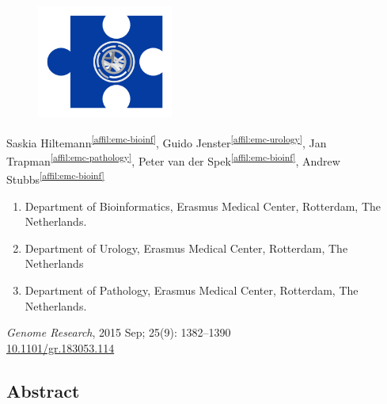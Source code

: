 \setcounter{NAT@ctr}{-1}
\chapter*{}

\begin{figure}[t!]
\centering
\includegraphics[height=10em]{frontmatter/images/chapter-header-variants.png}
\end{figure}
\vspace{-4cm}

\label{chapter:vnmethod}

Saskia Hiltemann\textsuperscript{\ref{affil:emc-bioinf}},
Guido Jenster\textsuperscript{\ref{affil:emc-urology}},
Jan Trapman\textsuperscript{\ref{affil:emc-pathology}},
Peter van der Spek\textsuperscript{\ref{affil:emc-bioinf}},
Andrew Stubbs\textsuperscript{\ref{affil:emc-bioinf}}

\small
\begin{enumerate}
\itemsep-0.5em
\item Department of Bioinformatics, Erasmus Medical Center, Rotterdam, The Netherlands. \label{affil:emc-bioinf}
\item Department of Urology, Erasmus Medical Center, Rotterdam, The Netherlands \label{affil:emc-urology}
\item Department of Pathology, Erasmus Medical Center, Rotterdam, The Netherlands. \label{affil:emc-pathology}
\end{enumerate}

{\color{chaptergrey}{Published in:}} \emph{Genome Research}, 2015 Sep; 25(9): 1382–1390 \\
{\color{chaptergrey}{DOI:}} \hyperref[https://doi.org/10.1101/gr.183053.114]{10.1101/gr.183053.114}

\normalsize

\section*{Abstract}

